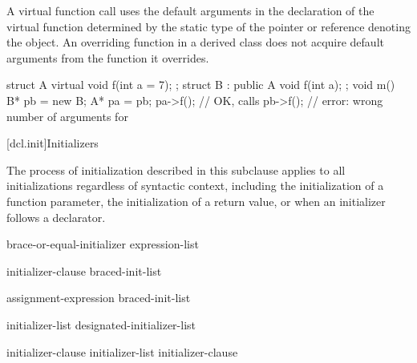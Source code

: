 \pnum
{}%
A virtual function call uses the default
arguments in the declaration of the virtual function determined
by the static type of the pointer or reference denoting the
object.
An overriding function in a derived class does not
acquire default arguments from the function it overrides.
\begin{example}

\begin{codeblock}
struct A {
  virtual void f(int a = 7);
};
struct B : public A {
  void f(int a);
};
void m() {
  B* pb = new B;
  A* pa = pb;
  pa->f();          // OK, calls 
  pb->f();          // error: wrong number of arguments for 
}
\end{codeblock}
\end{example}%
%

[dcl.init]{Initializers}%

\pnum
The process of initialization described in this subclause applies to
all initializations regardless of syntactic context, including the
initialization of a function parameter, the
initialization of a return value, or when an
initializer follows a declarator.

\begin{bnf}
\br
    brace-or-equal-initializer\br
    \terminal{(} expression-list \terminal{)}
\end{bnf}

\begin{bnf}
\br
    \terminal{=} initializer-clause\br
    braced-init-list
\end{bnf}

\begin{bnf}
\br
    assignment-expression\br
    braced-init-list
\end{bnf}

\begin{bnf}
\br
    \terminal{\{} initializer-list \opt{\terminal{,}} \terminal{\}}\br
    \terminal{\{} designated-initializer-list \opt{\terminal{,}} \terminal{\}}\br
    \terminal{\{} \terminal{\}}
\end{bnf}

\begin{bnf}
\br
    initializer-clause \br
    initializer-list \terminal{,} initializer-clause 
\end{bnf}

